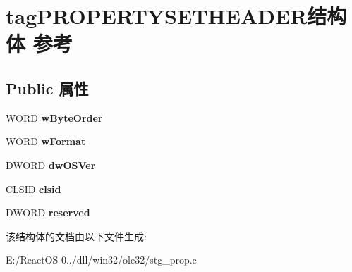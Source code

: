 \hypertarget{structtag_p_r_o_p_e_r_t_y_s_e_t_h_e_a_d_e_r}{}\section{tag\+P\+R\+O\+P\+E\+R\+T\+Y\+S\+E\+T\+H\+E\+A\+D\+E\+R结构体 参考}
\label{structtag_p_r_o_p_e_r_t_y_s_e_t_h_e_a_d_e_r}
\subsection*{Public 属性}
\begin{DoxyCompactItemize}
\item 
\mbox{\label{structtag_p_r_o_p_e_r_t_y_s_e_t_h_e_a_d_e_r_a483060178e3ad1d587c61f265ee47b53}} 
W\+O\+RD {\bfseries w\+Byte\+Order}
\item 
\mbox{\label{structtag_p_r_o_p_e_r_t_y_s_e_t_h_e_a_d_e_r_a42c588c58569d6962734869805500842}} 
W\+O\+RD {\bfseries w\+Format}
\item 
\mbox{\label{structtag_p_r_o_p_e_r_t_y_s_e_t_h_e_a_d_e_r_aefe52d50fba213d23201252c042e7463}} 
D\+W\+O\+RD {\bfseries dw\+O\+S\+Ver}
\item 
\mbox{\label{structtag_p_r_o_p_e_r_t_y_s_e_t_h_e_a_d_e_r_a446073a1192ef0bebe004909d9def2dc}} 
\hyperlink{struct___i_i_d}{C\+L\+S\+ID} {\bfseries clsid}
\item 
\mbox{\label{structtag_p_r_o_p_e_r_t_y_s_e_t_h_e_a_d_e_r_a6b2e81edd334bf6144cd2c68cd3ab7c7}} 
D\+W\+O\+RD {\bfseries reserved}
\end{DoxyCompactItemize}


该结构体的文档由以下文件生成\+:\begin{DoxyCompactItemize}
\item 
E\+:/\+React\+O\+S-\/0../dll/win32/ole32/stg\+\_\+prop.\+c\end{DoxyCompactItemize}
